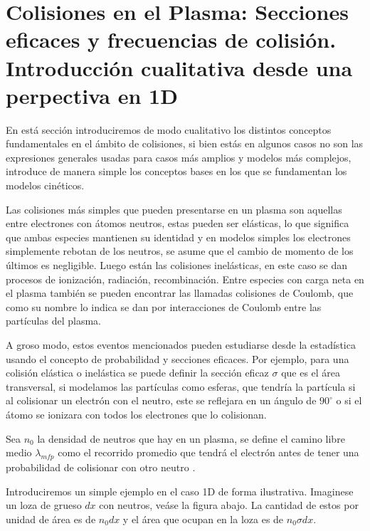\section{Colisiones en el Plasma: Secciones eficaces y frecuencias de colisi\'on. Introducci\'on cualitativa desde una perpectiva en 1D}

  En est\'a secci\'on introduciremos de modo cualitativo los distintos conceptos fundamentales en el \'ambito de colisiones, si bien est\'as en algunos casos no son las expresiones generales usadas para casos m\'as amplios y modelos m\'as complejos, introduce de manera simple los conceptos bases en los que se fundamentan los modelos cin\'eticos. 

  Las colisiones m\'as simples que pueden presentarse en un plasma son aquellas entre electrones con \'atomos neutros, estas pueden ser el\'asticas, lo que significa que ambas especies mantienen su identidad y en modelos simples los electrones simplemente rebotan de los neutros, se asume que el cambio de momento de los \'ultimos es negligible. Luego est\'an las colisiones inel\'asticas, en este caso se dan procesos de ionizaci\'on, radiaci\'on, recombinaci\'on. Entre especies con carga neta en el plasma tambi\'en se pueden encontrar las llamadas colisiones de Coulomb, que como su nombre lo indica se dan por interacciones de Coulomb entre las part\'iculas del plasma. 

  A groso modo, estos eventos mencionados pueden estudiarse desde la estad\'istica usando el concepto de probabilidad y secciones eficaces. Por ejemplo, para una colisi\'on el\'astica o inel\'astica se puede definir la secci\'on eficaz $\sigma$ que es el \'area transversal, si modelamos las part\'iculas como esferas, que tendr\'ia la part\'icula si al colisionar un electr\'on con el neutro, este se reflejara en un \'angulo de $90^\circ$ o si el \'atomo se ionizara con todos los electrones que lo colisionan.

    Sea $n_0$ la densidad de neutros que hay en un plasma, se define el camino libre medio $\lambda_{mfp}$ como el recorrido promedio que tendr\'a el electr\'on antes de tener una probabilidad de colisionar con otro neutro \cite{goldston1995}. 

    Introduciremos un simple ejemplo en el caso 1D de forma ilustrativa. Imaginese un loza de grueso $dx$ con neutros, ve\'ase la figura abajo. La cantidad de estos por unidad de \'area es de $n_0dx$ y el \'area que ocupan en la loza es de $n_0 \sigma dx$. 

